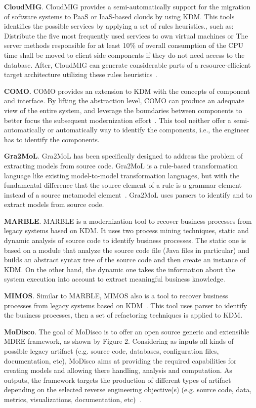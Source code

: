 \textbf{CloudMIG}. CloudMIG provides a semi-automatically support for the migration of software systems to PaaS or IaaS-based clouds by using KDM. This tools identifies the possible services by applying a set of rules heuristics., such as: Distribute the five most frequently used services to own virtual machines or The server methods responsible for at least 10\% of overall consumption of the CPU time shall be moved to client side components if they do not need access to the database. After, CloudMIG can generate considerable parts of a resource-efficient target architecture utilizing these rules heuristics~\cite{SMR:SMR582}. 

\textbf{COMO}. COMO provides an extension to KDM with the concepts of component and interface. By lifting the abstraction level, COMO can produce an adequate view of the entire system, and leverage the boundaries between components to better focus the subsequent modernization effort~\cite{5773392}. This tool neither offer a semi-automatically or automatically way to identify the components, i.e., the engineer has to identify the components.

\textbf{Gra2MoL}. Gra2MoL has been specifically designed to address the problem of extracting models from source code. Gra2MoL is a rule-based transformation language like existing model-to-model transformation languages, but with the fundamental difference that the source element of a rule is a grammar element instead of a source metamodel element~\cite{5440163}. Gra2MoL uses parsers to identify and to extract models from source code.

\textbf{MARBLE}. MARBLE is a modernization tool to recover business processes from legacy systems based on KDM. It uses two process mining techniques, static and dynamic analysis of source code to identify business processes. The static one is based on a module that analyze the source code file (Java files in particular) and builds an abstract syntax tree of the source code and then create an instance of KDM. On the other hand, the dynamic one takes the information about the system execution into account to extract meaningful business knowledge.

\textbf{MIMOS}. Similar to MARBLE, MIMOS also is a tool to recover business processes from legacy systems based on KDM~\cite{6498507}. This tool uses parser to identify the business processes, then a set of refactoring techniques is applied to KDM.

\textbf{MoDisco}. The goal of MoDisco is to offer an open source generic and extensible MDRE framework, as shown by Figure 2. Considering as inputs all kinds of possible legacy artifact (e.g. source code, databases, configuration files, documentation, etc), MoDisco aims at providing the required capabilities for creating models and allowing there handling, analysis and computation. As outputs, the framework targets the production of different types of artifact depending on the selected reverse engineering objective(s) (e.g. source code, data, metrics, visualizations, documentation, etc)~\cite{Bruneliere:2010:MGE:1858996.1859032}.

